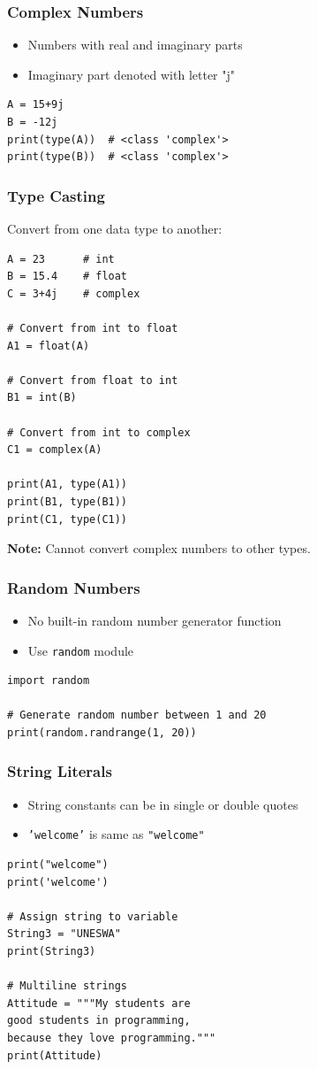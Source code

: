 \documentclass[aspectratio=169]{beamer}
\begin{document}
\begin{frame}[fragile]
\frametitle{Complex Numbers}
\begin{itemize}
\item Numbers with real and imaginary parts
\item Imaginary part denoted with letter "j"
\end{itemize}

\begin{lstlisting}
A = 15+9j
B = -12j
print(type(A))  # <class 'complex'>
print(type(B))  # <class 'complex'>
\end{lstlisting}
\end{frame}

\begin{frame}[fragile]
\frametitle{Type Casting}
Convert from one data type to another:

\begin{lstlisting}
A = 23      # int
B = 15.4    # float
C = 3+4j    # complex

# Convert from int to float
A1 = float(A)

# Convert from float to int
B1 = int(B)

# Convert from int to complex
C1 = complex(A)

print(A1, type(A1))
print(B1, type(B1))
print(C1, type(C1))
\end{lstlisting}

\textbf{Note:} Cannot convert complex numbers to other types.
\end{frame}

\begin{frame}[fragile]
\frametitle{Random Numbers}
\begin{itemize}
\item No built-in random number generator function
\item Use \texttt{random} module
\end{itemize}

\begin{lstlisting}
import random

# Generate random number between 1 and 20
print(random.randrange(1, 20))
\end{lstlisting}
\end{frame}

\begin{frame}[fragile]
\frametitle{String Literals}
\begin{itemize}
\item String constants can be in single or double quotes
\item \texttt{'welcome'} is same as \texttt{"welcome"}
\end{itemize}

\begin{lstlisting}
print("welcome")
print('welcome')

# Assign string to variable
String3 = "UNESWA"
print(String3)

# Multiline strings
Attitude = """My students are
good students in programming,
because they love programming."""
print(Attitude)
\end{lstlisting}
\end{frame}
\end{document}
